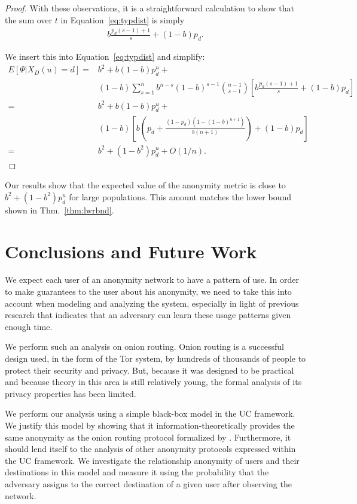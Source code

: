 \documentclass[prodmode,acmtissec]{acmsmall}
\begin{document}
\begin{proof}
With these observations, it is a straightforward calculation to show that the sum over $t$ in Equation~\ref{eq:typdist} is simply
\begin{align*}
b\frac{p_d (s-1)+1}{s} + (1-b) p_d.
\end{align*}


We insert this into Equation~\ref{eq:typdist} and simplify:
\begin{align*}
E[\Psi|X_D(u)=d] = &b^2 + b(1-b)p^u_d + \\
&(1-b)\sum_{s=1}^n b^{n-s} (1-b)^{s-1} \binom{n-1}{s-1} \left[ b\frac{p_d (s-1)+1}{s} + (1-b) p_d \right]\\
=  &b^2 + b(1-b)p^u_d + \\
&(1-b)\left[b\left(p_d + \frac{(1-p_d)(1-(1-b)^{n+1})}{b(n+1)}\right) + (1-b)p_d \right]\\
=  &b^2 + (1-b^2)p^u_d + O(1/n).
\end{align*}
\end{proof}

Our results show that the expected value of the anonymity metric is close to $b^2 + (1-b^2)p^u_d$ for large populations.  This amount matches the lower bound shown in Thm.~\ref{thm:lwrbnd}.

\section{Conclusions and Future Work}
\label{conclusions}
We expect each user of an anonymity network to have a pattern of use.  In order to make guarantees to the user about his anonymity, we need to take this into account when modeling and analyzing the system, especially in light of previous research that indicates that an adversary can learn these usage patterns given enough time.

We perform such an analysis on onion routing.  Onion routing is a successful design used, in the form of the Tor system, by hundreds of thousands of people to protect their security and privacy.  But, because it was designed to be practical and because theory in this area is still relatively young, the formal analysis of its privacy properties has been limited.

We perform our analysis using a simple black-box model in the UC framework. We justify this model by showing that it information-theoretically provides the same anonymity as the onion routing protocol formalized by . Furthermore, it should lend itself to the analysis of other anonymity protocols expressed within the UC framework.  We investigate the relationship anonymity of users and their destinations in this model and measure it using the probability that the adversary assigns to the correct destination of a given user after observing the network.
\end{document}
